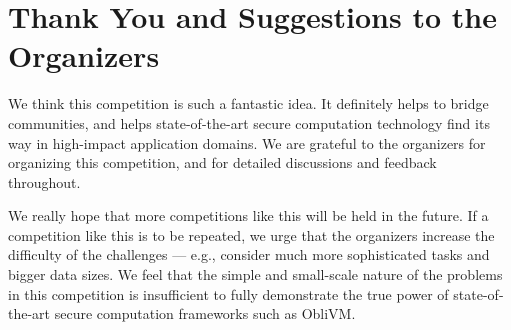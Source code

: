\documentclass[11pt]{article}
\begin{document}
\section{Thank You and Suggestions to the Organizers}
We think this competition is such a fantastic idea. 
It definitely helps to bridge communities, and helps 
state-of-the-art secure computation technology  
find its way in high-impact application domains.
We are grateful to the organizers for organizing this competition,
and for detailed discussions and feedback 
throughout.

We really hope that more competitions like this will be held in the future.
If a competition like this is to be repeated, we 
urge that the organizers increase the difficulty 
of the challenges --- e.g., consider much more sophisticated tasks
and bigger data sizes. 
We feel that the simple and small-scale nature of the problems  
in this competition is insufficient to fully demonstrate the true power
of state-of-the-art secure computation frameworks such as {\sf ObliVM}.




\end{document}
